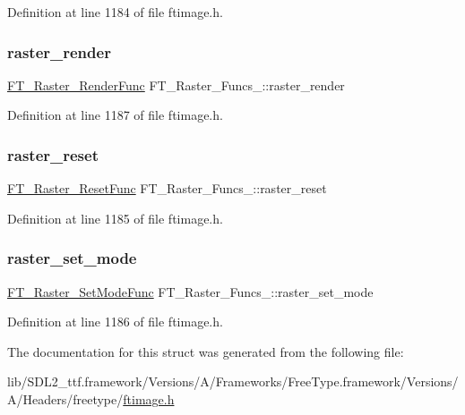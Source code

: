 Definition at line 1184 of file ftimage.\+h.

\mbox{\label{struct_f_t___raster___funcs___a7479a3def4522ce2667d6772e7bb96a5}} 
\subsubsection{\texorpdfstring{raster\_render}{raster\_render}}
{\footnotesize\ttfamily \mbox{\hyperlink{ftimage_8h_a4da783a601182e9e5b9d75584fd814ec}{F\+T\+\_\+\+Raster\+\_\+\+Render\+Func}} F\+T\+\_\+\+Raster\+\_\+\+Funcs\+\_\+\+::raster\+\_\+render}



Definition at line 1187 of file ftimage.\+h.

\mbox{\label{struct_f_t___raster___funcs___a91e9decd6066090a5f306f33f9815d39}} 
\subsubsection{\texorpdfstring{raster\_reset}{raster\_reset}}
{\footnotesize\ttfamily \mbox{\hyperlink{ftimage_8h_a0ae680a37517fe355321f780123d12f6}{F\+T\+\_\+\+Raster\+\_\+\+Reset\+Func}} F\+T\+\_\+\+Raster\+\_\+\+Funcs\+\_\+\+::raster\+\_\+reset}



Definition at line 1185 of file ftimage.\+h.

\mbox{\label{struct_f_t___raster___funcs___a3b37c781e54cf933cb60f57f2d45b32c}} 
\subsubsection{\texorpdfstring{raster\_set\_mode}{raster\_set\_mode}}
{\footnotesize\ttfamily \mbox{\hyperlink{ftimage_8h_a959011dc7420bae5989460bfd0727bd1}{F\+T\+\_\+\+Raster\+\_\+\+Set\+Mode\+Func}} F\+T\+\_\+\+Raster\+\_\+\+Funcs\+\_\+\+::raster\+\_\+set\+\_\+mode}



Definition at line 1186 of file ftimage.\+h.



The documentation for this struct was generated from the following file\+:\begin{DoxyCompactItemize}
\item 
lib/\+S\+D\+L2\+\_\+ttf.\+framework/\+Versions/\+A/\+Frameworks/\+Free\+Type.\+framework/\+Versions/\+A/\+Headers/freetype/\mbox{\hyperlink{ftimage_8h}{ftimage.\+h}}\end{DoxyCompactItemize}
